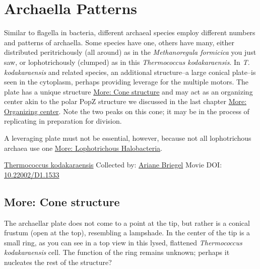 \documentclass[]{tufte-book}
\begin{document}
\hypertarget{archaella-patterns}{%
\section{Archaella Patterns}\label{archaella-patterns}}

Similar to flagella in bacteria, different archaeal species employ different numbers and patterns of archaella. Some species have one, others have many, either distributed peritrichously (all around) as in the \emph{Methanoregula formicica} you just saw, or lophotrichously (clumped) as in this \emph{Thermococcus kodakaraensis}. In \emph{T. kodakaraensis} and related species, an additional structure--a large conical plate--is seen in the cytoplasm, perhaps providing leverage for the multiple motors. The plate has a unique structure \protect\hyperlink{Cone_structure}{More: Cone structure} and may act as an organizing center akin to the polar PopZ structure we discussed in the last chapter \protect\hyperlink{Organizing_center}{More: Organizing center}. Note the two peaks on this cone; it may be in the process of replicating in preparation for division.

A leveraging plate must not be essential, however, because not all lophotrichous archaea use one \protect\hyperlink{Lophotrichous_Halobacteria}{More: Lophotrichous Halobacteria}.



\hypertarget{htmlwidget-fded999ecf7954c0507c}{}

\label{fig:6-9}\protect\hyperlink{tree}{Thermococcus kodakaraensis} Collected by: \protect\hyperlink{ariane_briegel}{Ariane Briegel} Movie DOI: \href{https://doi.org/10.22002/D1.1533}{10.22002/D1.1533}

\hypertarget{Cone_structure}{%
\subsection*{More: Cone structure}\label{Cone_structure}}

The archaellar plate does not come to a point at the tip, but rather is a conical frustum (open at the top), resembling a lampshade. In the center of the tip is a small ring, as you can see in a top view in this lysed, flattened \emph{Thermococcus kodakaraensis} cell. The function of the ring remains unknown; perhaps it nucleates the rest of the structure?



\hypertarget{htmlwidget-7692b78afe2bc652506d}{}
\end{document}
